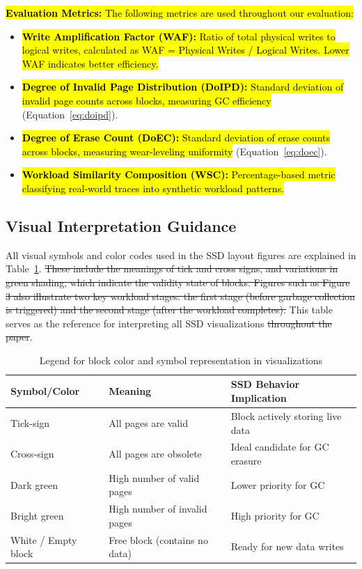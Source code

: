 \documentclass{ieeeaccess}
\begin{document}
\hl{\textbf{Evaluation Metrics:} The following metrics are used throughout our evaluation:}
\begin{itemize}
    \item \hl{\textbf{Write Amplification Factor (WAF):} Ratio of total physical writes to logical writes, calculated as WAF = Physical Writes / Logical Writes. Lower WAF indicates better efficiency.}
    \item \hl{\textbf{Degree of Invalid Page Distribution (DoIPD):} Standard deviation of invalid page counts across blocks, measuring GC efficiency} (Equation~\ref{eq:doipd}).
    \item \hl{\textbf{Degree of Erase Count (DoEC):} Standard deviation of erase counts across blocks, measuring wear-leveling uniformity} (Equation~\ref{eq:doec}).
    \item \hl{\textbf{Workload Similarity Composition (WSC):} Percentage-based metric classifying real-world traces into synthetic workload patterns.}
\end{itemize}


\subsection{Visual Interpretation Guidance}
All visual symbols and color codes used in the SSD layout figures are explained in Table~\ref{table:visual_interpretation}. \sout{These include the meanings of tick and cross signs, and variations in green shading, which indicate the validity state of blocks. Figures such as Figure 3 also illustrate two key workload stages: the first stage (before garbage collection is triggered) and the second stage (after the workload completes).} This table serves as the reference for interpreting all SSD visualizations \sout{throughout the paper}.

\begin{table}
    \centering
    \caption{Legend for block color and symbol representation in visualizations}
    \label{table:visual_interpretation}
    \begin{tabular}{|p{1.6cm}|p{2.6cm}|p{3.1cm}|}
        \hline
        \textbf{Symbol/Color} & \textbf{Meaning} & \textbf{SSD Behavior Implication} \\
        \hline
        Tick-sign & All pages are valid & Block actively storing live data \\
        \hline
        Cross-sign & All pages are obsolete & Ideal candidate for GC erasure \\
        \hline
        Dark green & High number of valid pages & Lower priority for GC \\
        \hline
        Bright green & High number of invalid pages & High priority for GC \\
        \hline
        White / Empty block & Free block (contains no data) & Ready for new data writes \\
        \hline
    \end{tabular}
\end{table}
\end{document}
